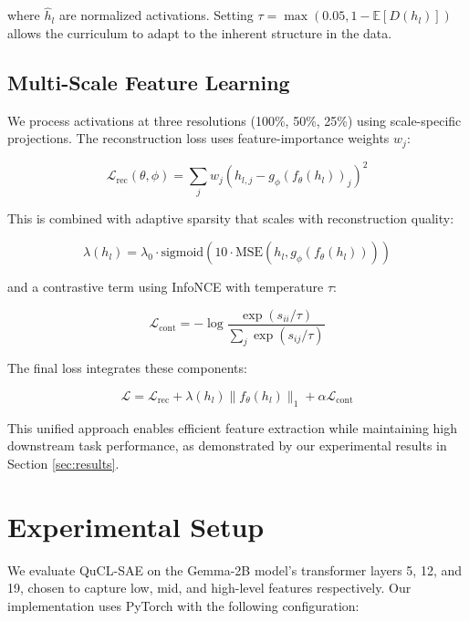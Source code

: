 \documentclass{article} %
\begin{document}
where $\hat{h}_l$ are normalized activations. Setting $\tau = \max(0.05, 1-\mathbb{E}[D(h_l)])$ allows the curriculum to adapt to the inherent structure in the data.

\subsection{Multi-Scale Feature Learning}
We process activations at three resolutions (100\%, 50\%, 25\%) using scale-specific projections. The reconstruction loss uses feature-importance weights $w_j$:

\begin{equation}
\mathcal{L}_{\text{rec}}(\theta,\phi) = \sum_j w_j(h_{l,j} - g_{\phi}(f_{\theta}(h_l))_j)^2
\end{equation}

This is combined with adaptive sparsity that scales with reconstruction quality:

\begin{equation}
\lambda(h_l) = \lambda_0 \cdot \text{sigmoid}(10 \cdot \text{MSE}(h_l, g_{\phi}(f_{\theta}(h_l))))
\end{equation}

and a contrastive term using InfoNCE with temperature $\tau$:

\begin{equation}
\mathcal{L}_{\text{cont}} = -\log \frac{\exp(s_{ii}/\tau)}{\sum_j \exp(s_{ij}/\tau)}
\end{equation}

The final loss integrates these components:

\begin{equation}
\mathcal{L} = \mathcal{L}_{\text{rec}} + \lambda(h_l)\|f_{\theta}(h_l)\|_1 + \alpha \mathcal{L}_{\text{cont}}
\end{equation}

This unified approach enables efficient feature extraction while maintaining high downstream task performance, as demonstrated by our experimental results in Section \ref{sec:results}.

\section{Experimental Setup}
\label{sec:experimental}

We evaluate QuCL-SAE on the Gemma-2B model's transformer layers 5, 12, and 19, chosen to capture low, mid, and high-level features respectively. Our implementation uses PyTorch \cite{paszke2019pytorch} with the following configuration:
\end{document}
